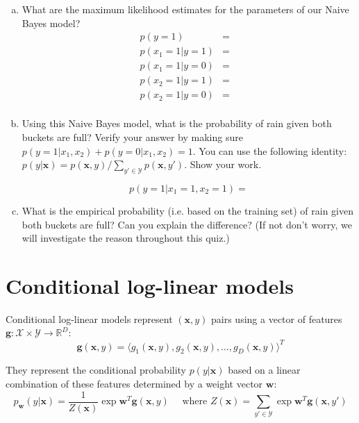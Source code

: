 \documentclass[a4paper,fleqn]{article}
\renewcommand{\vec}{\mathbf}
\begin{document}
\begin{enumerate}[(a)]
\item What are the maximum likelihood estimates for the parameters of
  our Naive Bayes model? \begin{eqnarray*}
   p(y=1)&=&\\                  %
   p(x_1=1|y=1)&=&\\            %
   p(x_1=1|y=0)&=&\\            %
   p(x_2=1|y=1)&=&\\            %
   p(x_2=1|y=0)&=&\\            %
\end{eqnarray*}
\item Using this Naive Bayes model, what is the probability of rain
  given both buckets are full?  Verify your answer by making sure
  $p(y=1|x_1,x_2) + p(y=0|x_1,x_2) = 1$.  You can use the following
  identity: $ p(y|\vec{x}) =
  p(\vec{x},y)/\sum_{y'\in\mathcal{Y}}p(\vec{x},y')$.  Show your work.

\vspace*{1cm}
\[ p(y=1 | x_1=1, x_2=1) = \]


\vspace*{3cm}
\item What is the empirical probability (i.e. based on the training
  set) of rain given both buckets are full?  Can you explain the
  difference?  (If not don't worry, we will investigate the reason
  throughout this quiz.)
\end{enumerate}

\newpage
\section{Conditional log-linear models}

Conditional log-linear models represent $(\vec{x}, y)$ pairs using a
vector of features $\vec{g}: \mathcal{X} \times \mathcal{Y}
\rightarrow \mathbb{R}^D$:
\[ \vec{g}(\vec{x}, y) = \langle g_1(\vec{x}, y), g_2(\vec{x}, y), \dots, g_D(\vec{x}, y) \rangle^T \]

They represent the conditional probability $p(y|\vec{x})$ based on a
linear combination of these features determined by a weight vector
$\vec{w}$:
\[ p_\vec{w}(y|\vec{x}) = \frac{1}{Z(\vec{x})}
\exp \vec{w}^T \vec{g}(\vec{x}, y)
\quad\text{ where }
Z(\vec{x}) = \sum_{y'\in\mathcal{Y}} \exp \vec{w}^T \vec{g}(\vec{x}, y')
\]
\end{document}
